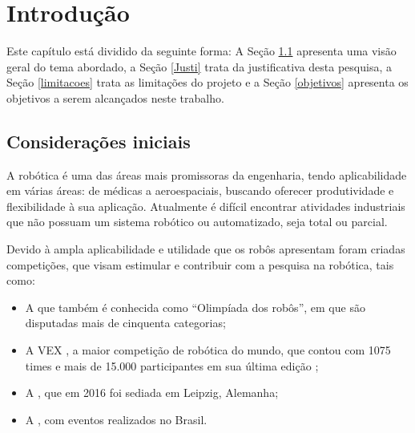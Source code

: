 \vspace{-1cm}
\chapter{Introdução} \label{cap:Introducao}

\vspace{-1.5cm} %
Este capítulo está dividido da seguinte forma: A Seção \ref{Consideracoes_iniciais} apresenta uma visão geral do tema abordado, 
a Seção \ref{Justi} trata da justificativa desta pesquisa, a Seção \ref{limitacoes} trata as limitações do 
projeto e a Seção \ref{objetivos} apresenta os objetivos a serem alcançados neste trabalho. 

\begin{spacing}{2}\end{spacing} %
\section{Considerações iniciais} \label{Consideracoes_iniciais}    

A robótica é uma das áreas mais promissoras da engenharia, tendo aplicabilidade em várias áreas: de médicas a 
aeroespaciais, buscando oferecer produtividade e flexibilidade à sua aplicação. 
Atualmente é difícil encontrar atividades industriais que não possuam um sistema robótico ou 
automatizado, seja total ou parcial.\par


Devido à ampla aplicabilidade e utilidade que os robôs apresentam foram criadas competições, que visam estimular e 
contribuir com a pesquisa na robótica, tais como:
\begin{itemize}
 \item A  que também é conhecida como ``Olimpíada dos robôs'', em 
que são disputadas mais de cinquenta categorias;
 \item A VEX , a maior competição de robótica do mundo, que contou com 
 1075 times e mais de 15.000 participantes em sua última edição \cite{vex_guiness};
 \item A , que em 2016 foi sediada em Leipzig, Alemanha;
 \item A , com eventos realizados no Brasil.\par
\end{itemize}

